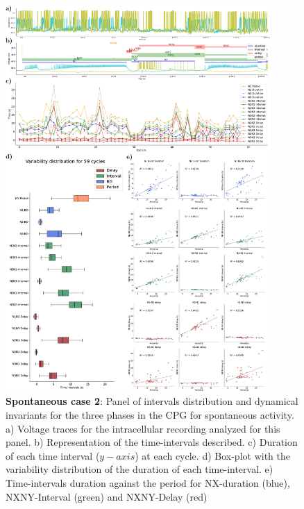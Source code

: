 \begin{figure}[htbp]
	\centering
	\includegraphics[width=0.9\textwidth]{./img/invariants/data/SUSSEX/prep3/images/3phases/panel_with_intervals.pdf}
	\caption{\textbf{Spontaneous case 2}: Panel of intervals distribution and dynamical invariants for the three phases in the CPG for spontaneous activity. a) Voltage traces for the intracellular recording analyzed for this panel. b) Representation of the time-intervals described. c) Duration of each time interval ($y-axis$) at each cycle. d) Box-plot with the variability distribution of the duration of each time-interval. e) Time-intervals duration against the period for NX-duration (blue), NXNY-Interval (green) and NXNY-Delay (red)}
	\label{fig:prep3 invariants}
\end{figure}

